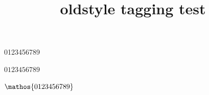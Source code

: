 \documentclass{article}
\title{oldstyle tagging test}
\begin{document}
0123456789


\textbf{}

$0123456789$

$\mathos{0123456789}$
\end{document}
